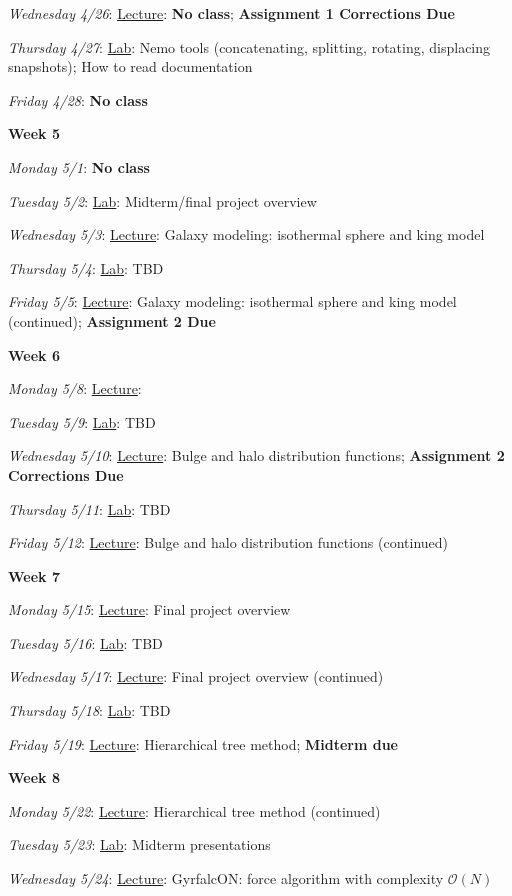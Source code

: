 \documentclass[12pt]{article}
\begin{document}
\emph{Wednesday 4/26}: \underline{Lecture}: \textbf{No class}; \textbf{Assignment 1 Corrections Due}

\emph{Thursday 4/27}: \underline{Lab}: Nemo tools (concatenating, splitting, rotating, displacing snapshots); How to read documentation

\emph{Friday 4/28}: \textbf{No class}

\noindent\textbf{Week 5}

\emph{Monday 5/1}: \textbf{No class}

\emph{Tuesday 5/2}: \underline{Lab}: Midterm/final project overview

\emph{Wednesday 5/3}: \underline{Lecture}: Galaxy modeling: isothermal sphere and king model

\emph{Thursday 5/4}: \underline{Lab}: TBD

\emph{Friday 5/5}: \underline{Lecture}: Galaxy modeling: isothermal sphere and king model (continued); \textbf{Assignment 2 Due}

\noindent\textbf{Week 6}

\emph{Monday 5/8}: \underline{Lecture}:

\emph{Tuesday 5/9}: \underline{Lab}: TBD

\emph{Wednesday 5/10}: \underline{Lecture}: Bulge and halo distribution functions; \textbf{Assignment 2 Corrections Due}

\emph{Thursday 5/11}: \underline{Lab}: TBD

\emph{Friday 5/12}: \underline{Lecture}: Bulge and halo distribution functions (continued)

\noindent\textbf{Week 7}

\emph{Monday 5/15}: \underline{Lecture}: Final project overview

\emph{Tuesday 5/16}: \underline{Lab}: TBD

\emph{Wednesday 5/17}: \underline{Lecture}: Final project overview (continued)

\emph{Thursday 5/18}: \underline{Lab}: TBD

\emph{Friday 5/19}: \underline{Lecture}: Hierarchical tree method;  \textbf{Midterm due}

\noindent\textbf{Week 8}

\emph{Monday 5/22}: \underline{Lecture}: Hierarchical tree method (continued)

\emph{Tuesday 5/23}: \underline{Lab}: Midterm presentations

\emph{Wednesday 5/24}: \underline{Lecture}: GyrfalcON: force algorithm with complexity $\mathcal{O}(N)$
\end{document}
